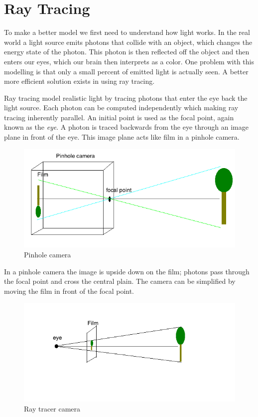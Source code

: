\section{Ray Tracing}

To make a better model we first need to understand how light works.  In the real world a light source emits photons that collide with an object, which changes the energy state of the photon.  This photon is then reflected off the object and then enters our eyes, which our brain then interprets as a color.  One problem with this modelling is that only a small percent of emitted light is actually seen.  A better more efficient solution exists in using ray tracing.  

Ray tracing model realistic light by tracing photons that enter the eye back the light source.  Each photon can be computed independently which making ray tracing inherently parallel.  An initial point is used as the focal point, again known as the \textit{eye}.  A photon is traced backwards from the eye through an image plane in front of the eye.  This image plane acts like film in a pinhole camera.  

\begin{figure}[H]
\begin{center}
\includegraphics[scale=0.50]{pineholecamera.png} 
\caption{Pinhole camera}
\label{pinhole-camera}
\end{center}
\end{figure}

In a pinhole camera the image is upside down on the film; photons pass through the focal point and cross the central plain.  The camera can be simplified by moving the film in front of the focal point.

 \begin{figure}[H]
 \begin{center}
\includegraphics[scale=0.50]{raycamera.png} 
\caption{Ray tracer camera}
\label{ray-camera}
\end{center}
\end{figure}

